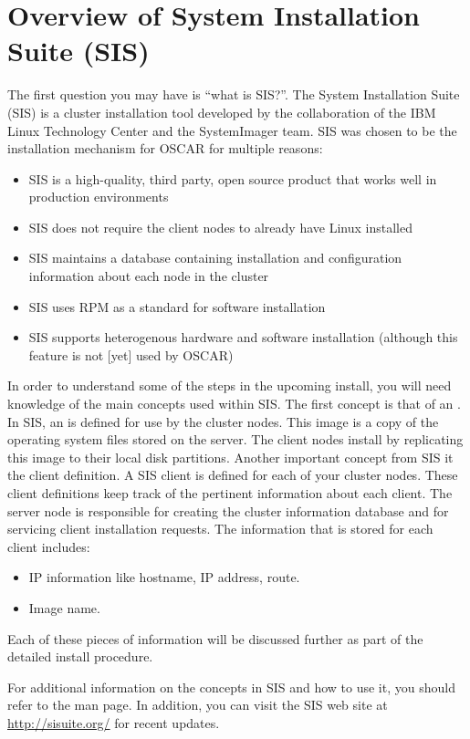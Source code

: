 %
%
%

\section{Overview of System Installation Suite (SIS)}
\label{sec:sis}

The first question you may have is ``what is SIS?''. The System
Installation Suite (SIS) is a cluster installation tool developed by
the collaboration of the IBM Linux Technology Center and the
SystemImager team.  SIS was chosen to be the installation mechanism
for OSCAR for multiple reasons:

\begin{itemize}
\item SIS is a high-quality, third party, open source product that
  works well in production environments

\item SIS does not require the client nodes to already have Linux
  installed
  
\item SIS maintains a database containing installation and
  configuration information about each node in the cluster

\item SIS uses RPM as a standard for software installation
  
\item SIS supports heterogenous hardware and software installation
  (although this feature is not [yet] used by OSCAR)
\end{itemize}

In order to understand some of the steps in the upcoming install, you
will need knowledge of the main concepts used within SIS. The first
concept is that of an . In SIS, an  is defined
for use by the cluster nodes. This image is a copy of the operating
system files stored on the server. The client nodes install by
replicating this image to their local disk partitions. Another
important concept from SIS it the client definition.  A SIS client is
defined for each of your cluster nodes.  These client definitions keep
track of the pertinent information about each client.  The server node
is responsible for creating the cluster information database and for
servicing client installation requests.  The information that is
stored for each client includes:

\begin{itemize}
\item IP information like hostname, IP address, route.
\item Image name.
\end{itemize}

Each of these pieces of information will be discussed further as part
of the detailed install procedure.

For additional information on the concepts in SIS and how to use it,
you should refer to the  man page.  In addition, you can
visit the SIS web site at \url{http://sisuite.org/} for recent
updates.

